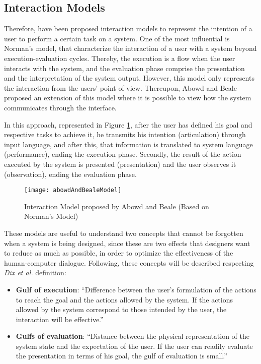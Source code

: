 \subsection{Interaction Models}
\label{subsec:interaction_models}

Therefore, have been proposed interaction models to represent the intention of a user to perform a certain task on a system. One of the most influential is Norman’s model, that characterize the interaction of a user with a system beyond execution-evaluation cycles. \cite{humanComputerInteraction} Thereby, the execution is a flow when the user interacts with the system, and the evaluation phase comprise the presentation and the interpretation of the system output. However, this model only represents the interaction from the users’ point of view. Thereupon, Abowd and Beale \cite{userSystemsAndInterfaces_aUnifyingFrameworkForInteraction} proposed an extension of this model where it is possible to view how the system communicates through the interface.

In this approach, represented in Figure \ref{fig:abowdAndBealeModel}, after the user has defined his goal and respective tasks to achieve it, he transmits his intention (articulation) through input language, and after this, that information is translated to system language (performance), ending the execution phase. Secondly, the result of the action executed by the system is presented (presentation) and the user observes it (observation), ending the evaluation phase.

\begin{figure}[htbp]
	\centering
	\texttt{[image: abowdAndBealeModel]}
	\caption{Interaction Model proposed by Abowd and Beale \cite{userInterfacesForAll_newPerspectivesIntoHumanComputerInteraction} (Based on Norman’s Model)}
	\label{fig:abowdAndBealeModel}
\end{figure}

These models are useful to understand two concepts that cannot be forgotten when a system is being designed, since these are two effects that designers want to reduce as much as possible, in order to optimize the effectiveness of the human-computer dialogue. Following, these concepts will be described respecting \textit{Dix et al.} \cite{humanComputerInteraction} definition:

\begin{itemize}
    \item \textbf{Gulf of execution}: “Difference between the user’s formulation of the actions to reach the goal and the actions allowed by the system. If the actions allowed by the system correspond to those intended by the user, the interaction will be effective.”
    \item \textbf{Gulfs of evaluation}: “Distance between the physical representation of the system state and the expectation of the user. If the user can readily evaluate the presentation in terms of his goal, the gulf of evaluation is small.”
\end{itemize}

